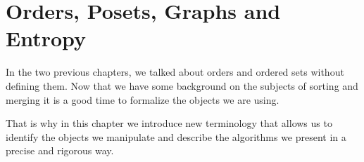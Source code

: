 \chapter{Orders, Posets, Graphs and Entropy}

In the two previous chapters, we talked about orders and ordered sets without
defining them. Now that we have some background on the subjects of
sorting and merging it is a good time to formalize the objects we are using.

That is why in this chapter we introduce new terminology that allows
us to identify the objects we manipulate and describe the algorithms we present
in a precise and rigorous way.

